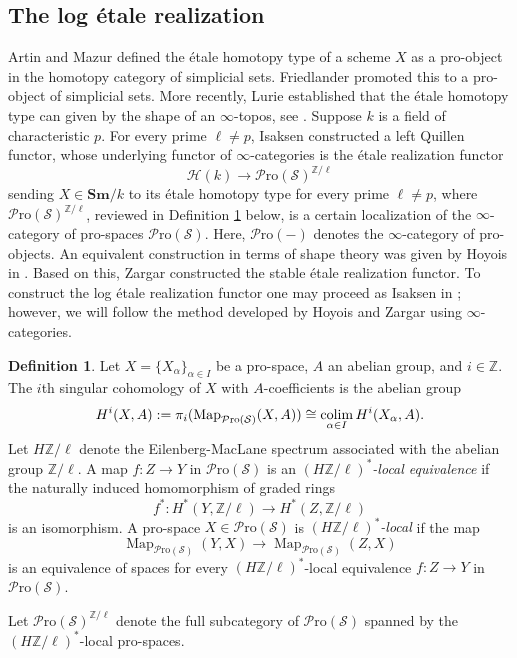 \documentclass[11pt, a4paper]{amsart}
\theoremstyle{definition}
\newtheorem{df}[thm]{Definition}
\numberwithin{equation}{subsection}
\newcommand{\Z}{\mathbb{Z}}
\newcommand{\Sm}{\mathbf{Sm}}
\newcommand{\colimit}{\mathop{\rm colim}}
\newcommand{\Eilenberg}{H}
\newcommand{\infSpc}{\mathcal{S}}
\newcommand{\infPro}{\mathcal{P}\mathrm{ro}}
\newcommand{\Map}{\operatorname{Map}}
\newcommand{\infH}{\mathcal{H}}
\begin{document}
\subsection{The log \'etale realization}
\label{subsection:ler}
Artin and Mazur \cite{zbMATH03290088} defined the \'etale homotopy type of a scheme $X$ as a pro-object 
in the homotopy category of simplicial sets.
Friedlander \cite{zbMATH03855996} promoted this to a pro-object of simplicial sets.
More recently, 
Lurie established that the \'etale homotopy type can given by the shape of an $\infty$-topos, 
see \cite[Example 7.1.6.9]{HTT}.
Suppose $k$ is a field of characteristic $p$.
For every prime $\ell\neq p$, 
Isaksen \cite[Theorem 6]{zbMATH02081955} constructed a left Quillen functor, 
whose underlying functor of $\infty$-categories is the \'etale realization functor
\[
\infH(k)
\to
\infPro(\infSpc)^{\Z/\ell}
\]
sending $X\in \Sm/k$ to its \'etale homotopy type for every prime $\ell\neq p$,
where $\infPro(\infSpc)^{\Z/\ell}$,
reviewed in Definition \ref{ketreal.7} below,
is a certain localization of the $\infty$-category of pro-spaces $\infPro(\infSpc)$.
Here, $\infPro(-)$ denotes the $\infty$-category of pro-objects.
An equivalent construction in terms of shape theory was given by Hoyois in \cite{Hoyoisetalesymmetric}.
Based on this, 
Zargar \cite{zbMATH07103864} constructed the stable \'etale realization functor.
To construct the log \'etale realization functor one may proceed as Isaksen in \cite{zbMATH02081955};
however, 
we will follow the method developed by Hoyois and Zargar using $\infty$-categories.



\begin{df}
\label{ketreal.7}
Let $X=\{X_\alpha\}_{\alpha\in I}$ be a pro-space, $A$ an abelian group, and $i\in\mathbb{Z}$.
The $i$th singular cohomology of $X$ with $A$-coefficients is the abelian group
\[
H^i(X,A)
:=
\pi_i(\Map_{\infPro(\infSpc)}(X,A))
\cong
\colimit_{\alpha\in I} H^i(X_\alpha,A).
\]
Let $\Eilenberg \Z/\ell$ denote the Eilenberg-MacLane spectrum associated with the abelian group $\Z/\ell$.
A map $f\colon Z\to Y$ in $\infPro(\infSpc)$ is an \emph{$(\Eilenberg \Z/\ell)^*$-local equivalence} 
if the naturally induced homomorphism of graded rings
\[
f^*
\colon
H^*(Y,\Z/\ell)
\to
H^*(Z,\Z/\ell)
\]
is an isomorphism.
A pro-space $X\in \infPro(\infSpc)$ is \emph{$(\Eilenberg \Z/\ell)^*$-local} if the map
\[
\Map_{\infPro(\infSpc)}(Y,X)
\to
\Map_{\infPro(\infSpc)}(Z,X)
\]
is an equivalence of spaces for every $(\Eilenberg \Z/\ell)^*$-local equivalence $f\colon Z\to Y$ in $\infPro(\infSpc)$.

Let $\infPro(\infSpc)^{\Z/\ell}$ denote the full subcategory of $\infPro(\infSpc)$ spanned by the 
$(\Eilenberg \Z/\ell)^*$-local pro-spaces.
\end{df}
\end{document}
